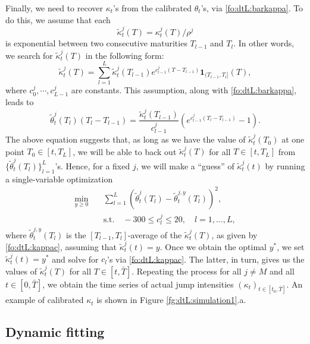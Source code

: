 \documentclass{article}
\numberwithin{equation}{section}
\def\bone{\mathbf{1}}
\def\bT{\bar{T}}
\def\tkappa{\tilde{\kappa}}
\def\tkappa{\tilde{\kappa}}
\begin{document}
Finally, we need to recover $\kappa_t$'s from the calibrated $\theta_t$'s, via \eqref{fo:dtL:barkappa}.
To do this, we assume that each 
$$
\tkappa^j_t(T)=\kappa^j_t(T)/\rho^j
$$ 
is exponential between two consecutive maturities $T_{l-1}$ and $T_l$. In other words, we search for $\tkappa_t^j(T)$ in the following form:
\begin{equation*}
\tkappa_t^j(T) = \sum_{l=1}^{L} \tkappa_t^j(T_{l-1}) e^{c^j_{l-1}(T - T_{l-1})} \bone_{(T_{l-1}, T_l]}(T),
\end{equation*}
where $c^j_0,\cdots,c^j_{L-1}$ are constants. This assumption, along with \eqref{fo:dtL:barkappa}, leads to
\begin{equation} \label{fo:dtL:kappac}
\tilde{\theta}^j_t(T_l) (T_l - T_{l-1}) = \frac{\tkappa^j_t(T_{l-1})}{c^j_{l-1}} \left(e^{c^j_{l-1}(T_l - T_{l-1})}-1 \right).
\end{equation}
The above equation suggests that, as long as we have the value of $\tkappa^j_t(T_0)$ at one point $T_0 \in [t,T_L]$, we will be able to back out $\tkappa^j_t(T)$ for all $T \in [t,T_L]$ from $\{\tilde{\theta}^j_t(T_l)\}_{l=1}^L$'s. Hence, for a fixed $j$, we will make a ``guess'' of $\tkappa^j_t(t)$ by running a single-variable optimization
\begin{align} \label{fo:dtL:yopt}
\min_{y \ge 0} \quad & \sum_{l=1}^L (\tilde{\theta}^j_t(T_l)-\tilde{\theta}^{j,y}_t(T_l))^2, \nonumber \\
& \text{s.t.} \quad -300 \leq c^j_l \leq 20, \quad l = 1,...,L, 
\end{align}
where $\tilde{\theta}^{j,y}_t(T_l)$ is the $[T_{l-1},T_l]$-average of the $\tkappa_t^j(T)$, as given by \eqref{fo:dtL:kappac}, assuming that $\tkappa^j_t(t) = y$. Once we obtain the optimal $y^*$, we set  $\tkappa^j_t(t) = y^*$ and solve for $c_l$'s via \eqref{fo:dtL:kappac}. The latter, in turn, gives us the values of $\tkappa^j_t(T)$ for all $T \in [t,\bT]$. Repeating the process for all $j \neq M$ and all $t\in[0,\bT]$, we obtain the time series of actual jump intensities $(\kappa_t)_{t\in[t_0,\bT]}$. An example of calibrated $\kappa_t$ is shown in Figure \ref{fg:dtL:simulation1}.a.







\subsection{Dynamic fitting}\label{subsec:dtL:dynamic}
\end{document}
